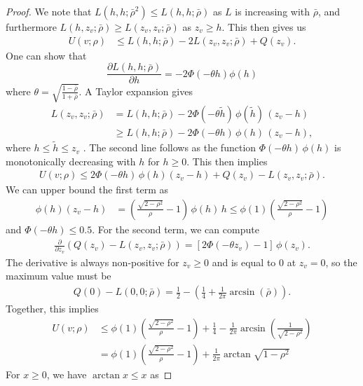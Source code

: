 \documentclass[11pt,a4paper]{article}
\begin{document}
\begin{appendices}
\begin{proof}
We note that $L(h,h; \bar{\rho}^2) \leq L(h,h;\bar{\rho})$ as $L$ is increasing with $\bar{\rho}$, and furthermore $L(h,z_v;\bar{\rho}) \geq  L(z_v,z_v;\bar{\rho})$ as $z_v \geq h$. This then gives us
\begin{align*}
  U(v;\rho)  &\leq  L(h,h; \bar{\rho}) - 2L(z_v, z_v; \bar{\rho}) + Q(z_v).
\end{align*}
One can show that 
$$
\frac{\partial L(h,h; \bar{\rho})}{\partial h} = -2\Phi(-\theta h) \phi(h)
$$
where $\theta = \sqrt{\frac{1-\bar{\rho}}{1+\bar{\rho}}}$. A Taylor expansion gives
\begin{align*}
    L(z_v,z_v;\bar{\rho} ) &= L(h,h;\bar{\rho})  - 2\Phi(-\theta \tilde{h})\,\phi(\tilde{h})\,(z_v- h)\\
    &\geq L(h,h;\bar{\rho})  - 2\Phi(-\theta {h})\,\phi({h})\,(z_v- h),
\end{align*}
where $h\leq \tilde{h} \leq z_v$ . The second line follows as the function $\Phi(-\theta h)\,\phi(h)$ is monotonically decreasing with $h$ for $h\geq 0$.  This then implies
\begin{align*}
   U(v;\rho)  \leq  2\Phi(-\theta {h})\,\phi({h})(z_v- h) +Q(z_v) -  L(z_v,z_v;\bar{\rho}).
\end{align*}
We can upper bound the first term as
\begin{align*}
    \phi(h)(z_v - h) &= \left(\frac{\sqrt{2-\rho^2}}{\rho} - 1\right)\,\phi(h)\,h 
    \leq \phi(1)\left(\frac{\sqrt{2-\rho^2}}{\rho} - 1\right)
\end{align*}
and $\Phi(-\theta h) \leq 0.5$. For the second term, we can compute
\begin{align*}
    \frac{\partial}{\partial z_v} (Q(z_v) - L(z_v,z_v;\bar{\rho})) =   [2\Phi(-\theta z_v)-1]\, \phi(z_v).
\end{align*}
The derivative is always non-positive for $z_v \geq 0$ and is equal to 0 at $z_v = 0$, so the maximum value must be
\begin{align*}
    Q(0) - L(0,0;\bar{\rho}) = \frac{1}{2}- \left(\frac{1}{4} + \frac{1}{2\pi}\arcsin(\bar{\rho})\right).
\end{align*}
 Together, this implies
\begin{align*}
U(v;\rho)  &\leq  \phi(1)\left(\frac{\sqrt{2-\rho^2}}{\rho} - 1\right) + \frac{1}{4} - \frac{1}{2\pi}\arcsin\left(\frac{1}{\sqrt{2-\rho^2}}\right) \\
    &=\phi(1)\left(\frac{\sqrt{2-\rho^2}}{\rho} - 1\right) + \frac{1}{2\pi}\arctan\sqrt{1-\rho^2}
\end{align*}
For $x \geq 0$, we have $\arctan x \leq x$ as

\end{proof}
\end{appendices}
\end{document}
